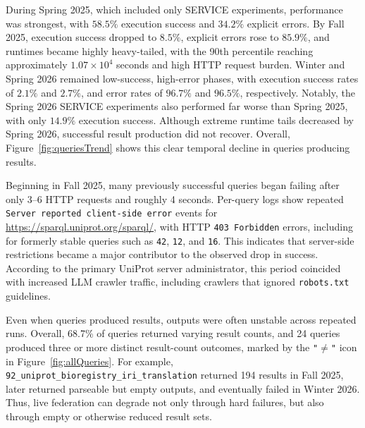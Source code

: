 \documentclass[runningheads]{llncs}
\begin{document}
During Spring 2025, which included only \textsc{SERVICE} experiments, performance was strongest, with \(58.5\%\) execution success and \(34.2\%\) explicit errors.
By Fall 2025, execution success dropped to \(8.5\%\), explicit errors rose to \(85.9\%\), and runtimes became highly heavy-tailed, with the 90th percentile reaching approximately \(1.07\times 10^4\) seconds and high HTTP request burden.
Winter and Spring 2026 remained low-success, high-error phases, with execution success rates of \(2.1\%\) and \(2.7\%\), and error rates of \(96.7\%\) and \(96.5\%\), respectively.
Notably, the Spring 2026 \textsc{SERVICE} experiments also performed far worse than Spring 2025, with only \(14.9\%\) execution success.
Although extreme runtime tails decreased by Spring 2026, successful result production did not recover.
Overall, Figure~\ref{fig:queriesTrend} shows this clear temporal decline in queries producing results.

Beginning in Fall 2025, many previously successful queries began failing after only 3--6 HTTP requests and roughly 4 seconds. 
Per-query logs show repeated \texttt{Server reported client-side error} events for \url{https://sparql.uniprot.org/sparql/}, with HTTP \texttt{403 Forbidden} errors, including for formerly stable queries such as \texttt{42}, \texttt{12}, and \texttt{16}. 
This indicates that server-side restrictions became a major contributor to the observed drop in success. 
According to the primary UniProt server administrator, this period coincided with increased LLM crawler traffic, including crawlers that ignored \texttt{robots.txt} guidelines.

Even when queries produced results, outputs were often unstable across repeated runs. 
Overall, 68.7\% of queries returned varying result counts, and 24 queries produced three or more distinct result-count outcomes, marked by the \texttt{"$\neq$"} icon in Figure~\ref{fig:allQueries}. 
For example, \texttt{92\_uniprot\_bioregistry\_iri\_translation} returned 194 results in Fall 2025, later returned parseable but empty outputs, and eventually failed in Winter 2026. 
Thus, live federation can degrade not only through hard failures, but also through empty or otherwise reduced result sets.
\end{document}

